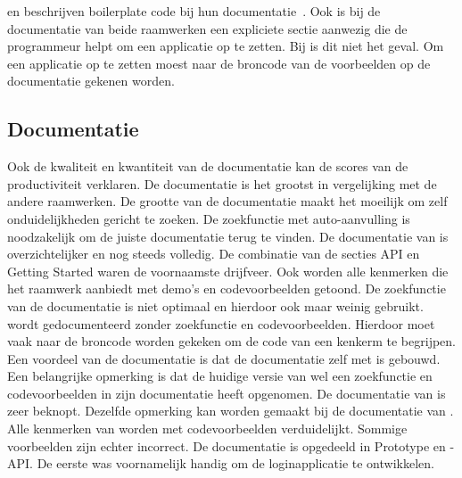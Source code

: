 \jqm{} en \kendo{} beschrijven boilerplate code bij hun documentatie~\cite{JQuery2012b,Telerikd}.
Ook is bij de documentatie van beide raamwerken een expliciete sectie aanwezig die de programmeur helpt om een applicatie op te zetten.
Bij \lungo{} is dit niet het geval.  
Om een \lungo{} applicatie op te zetten moest naar de broncode van de voorbeelden op de documentatie gekenen worden.

\subsection{Documentatie}
Ook de kwaliteit en kwantiteit van de documentatie kan de scores van de productiviteit verklaren.
De \st{} documentatie is het grootst in vergelijking met de andere raamwerken.
De grootte van de documentatie maakt het moeilijk om zelf onduidelijkheden gericht te zoeken.
De zoekfunctie met auto-aanvulling is noodzakelijk om de juiste documentatie terug te vinden.
De documentatie van \kendo{} is overzichtelijker en nog steeds volledig.
De combinatie van de secties API en Getting Started waren de voornaamste drijfveer.
Ook worden alle kenmerken die het raamwerk aanbiedt met demo's en codevoorbeelden getoond.
De zoekfunctie van de documentatie is niet optimaal en hierdoor ook maar weinig gebruikt.
\jqm{} wordt gedocumenteerd zonder zoekfunctie en codevoorbeelden.
Hierdoor moet vaak naar de broncode worden gekeken om de code van een kenkerm te begrijpen.
Een voordeel van de \jqm{} documentatie is dat de documentatie zelf met \jqm{} is gebouwd.
Een belangrijke opmerking is dat de huidige versie van \jqm{} wel een zoekfunctie en codevoorbeelden in zijn documentatie heeft opgenomen.
De documentatie van \lungo{} is zeer beknopt.
Dezelfde opmerking kan worden gemaakt bij de documentatie van \quo.
Alle kenmerken van \lungo{} worden met codevoorbeelden verduidelijkt.
Sommige voorbeelden zijn echter incorrect.
De documentatie is opgedeeld in Prototype en \js-API.
De eerste was voornamelijk handig om de loginapplicatie te ontwikkelen. %

